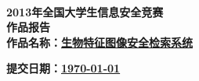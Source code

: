 
\newcommand{\prop}[3] {
  \Large \textsf{\textbf{#1：\underline {#2 \hspace{#3}}}}
}

\begin{titlepage}
  \begin{center}
    ~\\[3.3cm]
    \textsf{\Huge \textbf{2013年全国大学生信息安全竞赛}} \\[0.7cm]
    \textsf{\Huge \textbf{作品报告}} \\[6.5cm]

    \prop{作品名称}{生物特征图像安全检索系统}{3.7cm}
    \prop{提交日期}{\today}{5.5cm}
  \end{center}
\end{titlepage}